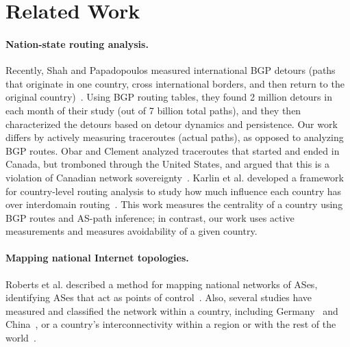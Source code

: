 \section{Related Work}
\label{related}

\paragraph{Nation-state routing analysis.}  Recently, Shah and
Papadopoulos measured international BGP detours (paths that originate in
one country, cross international borders, and then return to the
original country)~\cite{shah2015characterizing}.  Using BGP routing
tables, they found 2 million detours in each month of their study (out
of 7 billion total paths), and they then characterized the detours based
on detour dynamics and persistence.  Our work differs by actively
measuring traceroutes (actual paths), as opposed to analyzing BGP
routes.  Obar and Clement analyzed traceroutes
that started and ended in Canada, but tromboned through the United
States, and argued that
this is a violation of Canadian network
sovereignty~\cite{obar2012internet}. 
Karlin et al. developed a framework for country-level
routing analysis to study how much influence each country has over
interdomain routing~\cite{karlin2009nation}.  This work measures the
centrality of a country using BGP routes and AS-path inference; in contrast, our work uses active 
measurements and measures avoidability of a given country. 

\paragraph{Mapping national Internet topologies.}  Roberts et
al. described a method for mapping national networks of ASes,
identifying ASes that act as points of control~\cite{roberts2011mapping}.  
Also, several studies have measured and classified the network within
a country, including
Germany~\cite{wahlisch2010framework,wahlisch2012exposing} and
China~\cite{zhou2007chinese}, or a country's interconnectivity within
a region or with the rest of the
world~\cite{bischof2015and,gupta2014peering,fanou2015diversity}.


